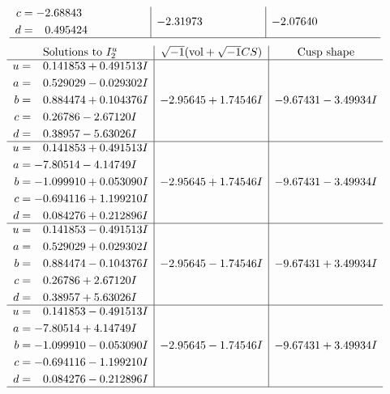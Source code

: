 \documentclass[1p]{elsarticle_modified}
\theoremstyle{definition}
\newcommand{\I}{\sqrt{-1}}
\begin{document}
$$\begin{array}{c|c|c}
\begin{aligned}
c &= -2.68843\phantom{ +0.000000I} \\
d &= \phantom{-}0.495424\phantom{ +0.000000I}\end{aligned}
 & -2.31973\phantom{ +0.000000I} & -2.07640\phantom{ +0.000000I}\\
 \hline 
 \end{array}$$\newpage$$\begin{array}{c|c|c}  
\text{Solutions to }I^u_{2}& \I (\text{vol} + \sqrt{-1}CS) & \text{Cusp shape}\\
 \hline 
\begin{aligned}
u &= \phantom{-}0.141853 + 0.491513 I \\
a &= \phantom{-}0.529029 - 0.029302 I \\
b &= \phantom{-}0.884474 + 0.104376 I \\
c &= \phantom{-}0.26786 - 2.67120 I \\
d &= \phantom{-}0.38957 - 5.63026 I\end{aligned}
 & -2.95645 + 1.74546 I & -9.67431 - 3.49934 I \\ \hline\begin{aligned}
u &= \phantom{-}0.141853 + 0.491513 I \\
a &= -7.80514 - 4.14749 I \\
b &= -1.099910 + 0.053090 I \\
c &= -0.694116 + 1.199210 I \\
d &= \phantom{-}0.084276 + 0.212896 I\end{aligned}
 & -2.95645 + 1.74546 I & -9.67431 - 3.49934 I \\ \hline\begin{aligned}
u &= \phantom{-}0.141853 - 0.491513 I \\
a &= \phantom{-}0.529029 + 0.029302 I \\
b &= \phantom{-}0.884474 - 0.104376 I \\
c &= \phantom{-}0.26786 + 2.67120 I \\
d &= \phantom{-}0.38957 + 5.63026 I\end{aligned}
 & -2.95645 - 1.74546 I & -9.67431 + 3.49934 I \\ \hline\begin{aligned}
u &= \phantom{-}0.141853 - 0.491513 I \\
a &= -7.80514 + 4.14749 I \\
b &= -1.099910 - 0.053090 I \\
c &= -0.694116 - 1.199210 I \\
d &= \phantom{-}0.084276 - 0.212896 I\end{aligned}
 & -2.95645 - 1.74546 I & -9.67431 + 3.49934 I\\
 \hline 
 \end{array}$$\newpage\newpage\renewcommand{\arraystretch}{1}
\end{document}

